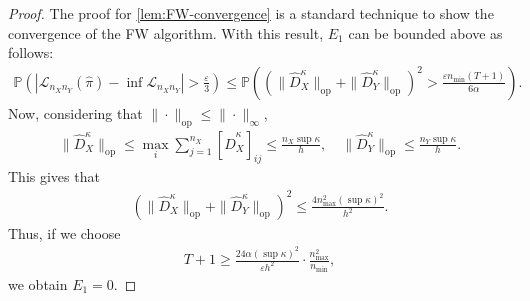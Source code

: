 \documentclass{article}
\begin{document}
\begin{proof}
	The proof for \cref{lem:FW-convergence} is a standard technique to show the convergence of the FW algorithm. With this result, $E_1$ can be bounded above as follows:
	\begin{align*}
		\mathbb{P}\left(\left\vert \mathcal{L}_{n_Xn_Y}(\hat{\pi}) - \inf \mathcal{L}_{n_Xn_Y} \right\vert > \frac{\varepsilon}{3}\right) \leq \mathbb{P}\left(\left(\|\hat{D}_X^\kappa\|_{\mathrm{op}} + \|\hat{D}_Y^\kappa\|_{\mathrm{op}}\right)^2 > \frac{\varepsilon n_{\min}(T+1)}{6\alpha}\right) .
	\end{align*}
	Now, considering that $\|\cdot\|_{\mathrm{op}} \leq \|\cdot\|_{\infty}$,
	\begin{align*}
		\|\hat{D}_X^\kappa\|_{\mathrm{op}} \leq \max_{i} \sum_{j=1}^{n_X} [\hat{D}_X^\kappa]_{ij} \leq \frac{n_X\sup\kappa}{h} , \quad \|\hat{D}_Y^\kappa\|_{\mathrm{op}} \leq \frac{n_Y\sup\kappa}{h} .
	\end{align*}
	This gives that
	\begin{align*}
		\left(\|\hat{D}_X^\kappa\|_{\mathrm{op}} + \|\hat{D}_Y^\kappa\|_{\mathrm{op}}\right)^2 \leq \frac{4n_{\max}^2(\sup\kappa)^2}{h^2} .
	\end{align*}
	Thus, if we choose
	\begin{align*}
		T + 1 \geq \frac{24\alpha(\sup\kappa)^2}{\varepsilon h^2} \cdot \frac{n_{\max}^2}{n_{\min}} ,
	\end{align*}
	we obtain $E_1 = 0$.
	
\end{proof}

\end{document}
